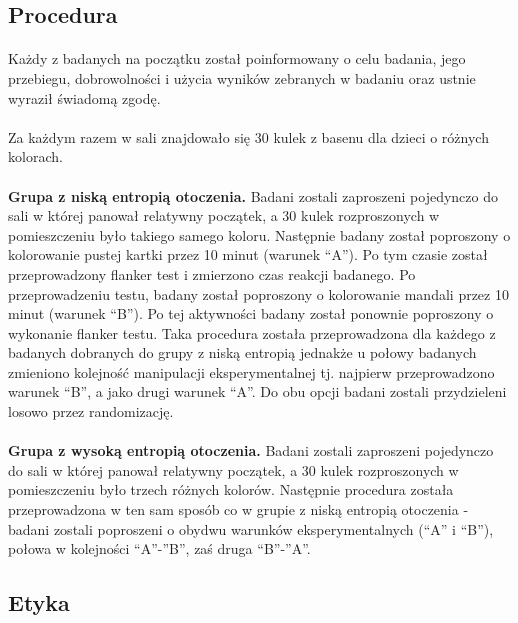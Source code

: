 \documentclass[12pt,a4paper,final,oneside,onecolumn,titlepage]{article}
\begin{document}
\subsection*{\normalsize{\textbf{Procedura}}}
\paragraph{}
Każdy z badanych na początku został poinformowany o celu badania, jego przebiegu, dobrowolności i użycia wyników zebranych w badaniu oraz ustnie wyraził świadomą zgodę.
\paragraph{}
Za każdym razem w sali znajdowało się 30 kulek z basenu dla dzieci o różnych kolorach.
\paragraph{}
\textbf{Grupa z niską entropią otoczenia.} Badani zostali zaproszeni pojedynczo do sali w której panował relatywny początek, a 30 kulek rozproszonych w pomieszczeniu było takiego samego koloru. Następnie badany został poproszony o kolorowanie pustej kartki przez 10 minut (warunek “A”). Po tym czasie został przeprowadzony flanker test i zmierzono czas reakcji badanego. Po przeprowadzeniu testu, badany został poproszony o kolorowanie mandali przez 10 minut (warunek “B”). Po tej aktywności badany został ponownie poproszony o wykonanie flanker testu. Taka procedura została przeprowadzona dla każdego z badanych dobranych do grupy z niską entropią jednakże u połowy badanych zmieniono kolejność manipulacji eksperymentalnej tj. najpierw przeprowadzono warunek “B”, a jako drugi warunek “A”. Do obu opcji badani zostali przydzieleni losowo przez randomizację.
\paragraph{}
\textbf{Grupa z wysoką entropią otoczenia.} Badani zostali zaproszeni pojedynczo do sali w której panował relatywny początek, a  30 kulek rozproszonych w pomieszczeniu było trzech różnych kolorów. Następnie procedura została przeprowadzona w ten sam sposób co w grupie z niską entropią otoczenia - badani zostali poproszeni o obydwu warunków eksperymentalnych (“A” i “B”), połowa w kolejności “A”-”B”, zaś druga “B”-”A”.
\subsection*{\normalsize{\textbf{Etyka}}}
\end{document}
